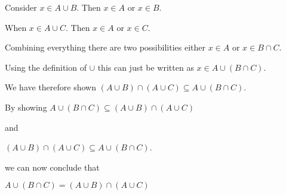 \documentclass[12pt]{article}
\begin{document}
Consider $x \in A \cup B$. Then $x \in A$ or $x \in B$.

When $x \in A \cup C$. Then $x \in A$ or $x \in C$.

Combining everything there are two possibilities either $x \in A$ or $x \in B \cap C$.

Using the definition of $\cup$ this can just be written as $x \in A \cup (B \cap C)$.

We have therefore shown $(A \cup B ) \cap (A \cup C) \subseteq A \cup (B \cap C)$.

By showing $A \cup (B \cap C) \subseteq (A \cup B ) \cap (A \cup C)$ 

and

$(A \cup B ) \cap (A \cup C) \subseteq A \cup (B \cap C)$.

we can now conclude that 

$A \cup (B \cap C) = (A \cup B ) \cap (A \cup C)$
\end{document}
